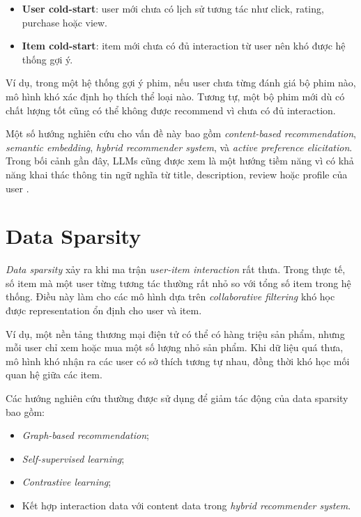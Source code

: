 \documentclass[12pt,a4paper]{article}
\begin{document}
\begin{itemize}[leftmargin=*]
    \item \textbf{User cold-start}: user mới chưa có lịch sử tương tác như click, rating, purchase hoặc view.
    \item \textbf{Item cold-start}: item mới chưa có đủ interaction từ user nên khó được hệ thống gợi ý.
\end{itemize}

Ví dụ, trong một hệ thống gợi ý phim, nếu user chưa từng đánh giá bộ phim nào, mô hình khó xác định họ thích thể loại nào. 
Tương tự, một bộ phim mới dù có chất lượng tốt cũng có thể không được recommend vì chưa có đủ interaction.

Một số hướng nghiên cứu cho vấn đề này bao gồm \textit{content-based recommendation}, \textit{semantic embedding}, \textit{hybrid recommender system}, và \textit{active preference elicitation}. 
Trong bối cảnh gần đây, LLMs cũng được xem là một hướng tiềm năng vì có khả năng khai thác thông tin ngữ nghĩa từ title, description, review hoặc profile của user \cite{zhang2025coldstart,wu2024llmrec}.

\section{Data Sparsity}

\textit{Data sparsity} xảy ra khi ma trận \textit{user-item interaction} rất thưa. 
Trong thực tế, số item mà một user từng tương tác thường rất nhỏ so với tổng số item trong hệ thống. 
Điều này làm cho các mô hình dựa trên \textit{collaborative filtering} khó học được representation ổn định cho user và item.

Ví dụ, một nền tảng thương mại điện tử có thể có hàng triệu sản phẩm, nhưng mỗi user chỉ xem hoặc mua một số lượng nhỏ sản phẩm. 
Khi dữ liệu quá thưa, mô hình khó nhận ra các user có sở thích tương tự nhau, đồng thời khó học mối quan hệ giữa các item.

Các hướng nghiên cứu thường được sử dụng để giảm tác động của data sparsity bao gồm:

\begin{itemize}[leftmargin=*]
    \item \textit{Graph-based recommendation};
    \item \textit{Self-supervised learning};
    \item \textit{Contrastive learning};
    \item Kết hợp interaction data với content data trong \textit{hybrid recommender system}.
\end{itemize}
\end{document}
